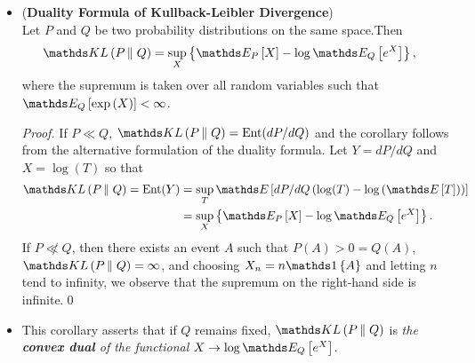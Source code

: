 \documentclass[11pt]{article}
\begin{document}
\begin{itemize}
\begin{proof}
\begin{align*}
\log\E{Q}{e^{\lambda(X- \E{Q}{X})}} &\ge \sup_{P \ll Q}\set{\lambda(\E{P}{X} - \E{Q}{X})  - \kl{P}{Q}}.
\end{align*} Conversely, setting
\begin{align*}
U &= \lambda\paren{X - \E{Q}{X}} - \sup_{P \ll Q}\set{\lambda(\E{P}{X} - \E{Q}{X})  - \kl{P}{Q}}
\end{align*} for every non-negative random variable $Y$ such that $\E{}{Y} = 1$,
\begin{align*}
\E{}{UY} \le \text{Ent}(Y).
\end{align*} Hence, $\E{}{e^{U}} \le 1$ by duality theorem, which means that 
\begin{align*}
\log \E{Q}{e^{\lambda\paren{X - \E{Q}{X}}}} &\le \sup_{P \ll Q}\set{\lambda(\E{P}{X} - \E{Q}{X})  - \kl{P}{Q}}. \qed
\end{align*}
\end{proof}

\item \begin{corollary}  (\textbf{Duality Formula of Kullback-Leibler Divergence}) \citep{thomas2006elements, boucheron2013concentration}\\
Let $P$ and $Q$ be two probability distributions on the same space.Then
\begin{align}
\kl{P}{Q} &= \sup_{X}\set{\E{P}{X} - \log \E{Q}{e^{X}} }, \label{eqn: duality_kl_divg}
\end{align} where the supremum is taken over all random variables such that $\E{Q}{\exp\paren{X}} < \infty$.
\end{corollary}
\begin{proof}
If $P \ll Q$, $\kl{P}{Q} = \text{Ent}(dP/dQ)$ and the corollary follows from the alternative formulation of the duality formula. Let $Y=dP/dQ$ and $X = \log(T)$ so that 
\begin{align*}
\kl{P}{Q} = \text{Ent}(Y) &= \sup_{T}\E{}{dP/dQ\paren{\log(T) - \log\paren{\E{}{T}}}} \\
&= \sup_{X}\set{\E{P}{X} - \log\E{Q}{e^{X}} }.
\end{align*}
If $P \not\ll Q$, then there exists an event $A$ such that $P(A) > 0 = Q(A)$, $\kl{P}{Q} = \infty$, and choosing $X_n = n\ind{A}$ and letting $n$ tend to infinity, we observe that the supremum on the right-hand side is infinite.\qed
\end{proof}

\item \begin{remark}
This corollary asserts that if $Q$ remains fixed, $\kl{P}{Q} $ is \emph{the \textbf{convex dual} of the functional}
$X \to \log\E{Q}{e^X}$.
\end{remark}


\end{itemize}
\end{document}
